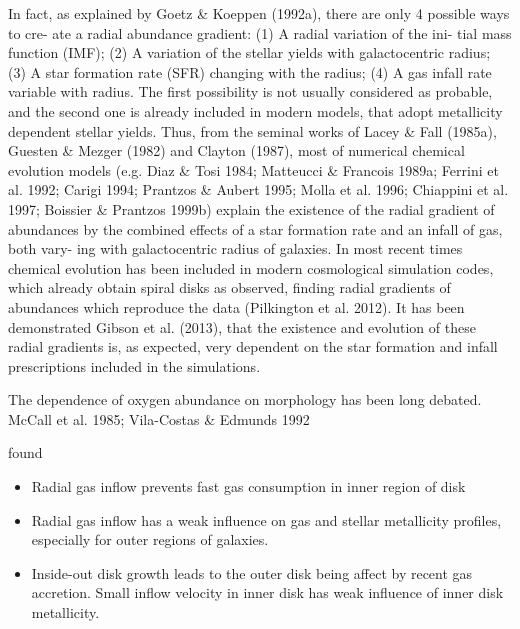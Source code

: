 \documentclass[11pt, a4paper, onecolumn]{article}
\begin{document}
\begin{multicols}{2}
    \citet{sanchez12} In fact, as explained by Goetz \& Koeppen (1992a),
    there are only 4 possible ways to cre- ate a radial abundance gradient:
    (1) A radial variation of the ini- tial mass function (IMF); (2) A
    variation of the stellar yields with galactocentric radius; (3) A star
    formation rate (SFR) changing with the radius; (4) A gas infall rate
    variable with radius.  The first possibility is not usually considered as
    probable, and the second one is already included in modern models, that
    adopt metallicity dependent stellar yields. Thus, from the seminal works of
    Lacey \& Fall (1985a), Guesten \& Mezger (1982) and Clayton (1987), most of
    numerical chemical evolution models (e.g.  Diaz \& Tosi 1984; Matteucci \&
    Francois 1989a; Ferrini et al.  1992; Carigi 1994; Prantzos \& Aubert
    1995; Molla et al.  1996; Chiappini et al. 1997; Boissier \& Prantzos
    1999b) explain the existence of the radial gradient of abundances by the
    combined effects of a star formation rate and an infall of gas, both
    vary- ing with galactocentric radius of galaxies. In most recent times
    chemical evolution has been included in modern cosmological simulation
    codes, which already obtain spiral disks as observed, finding radial
    gradients of abundances which reproduce the data (Pilkington et al.
    2012). It has been demonstrated Gibson et al.  (2013), that the existence
    and evolution of these radial gradients is, as expected, very dependent on
    the star formation and infall prescriptions included in the simulations.


    The dependence of oxygen abundance on morphology has been long debated.
    McCall et al. 1985; Vila-Costas \& Edmunds 1992

    \citet{fu13} found
    \begin{itemize}
    
        \item Radial gas inflow prevents fast gas consumption in inner region
        of disk

        \item Radial gas inflow has a weak influence on gas and stellar
        metallicity profiles, especially for outer regions of galaxies.

        \item Inside-out disk growth leads to the outer disk being affect by
        recent gas accretion. Small inflow velocity in inner disk has weak
        influence of inner disk metallicity. 
        

\end{itemize}
\end{multicols}
\end{document}
